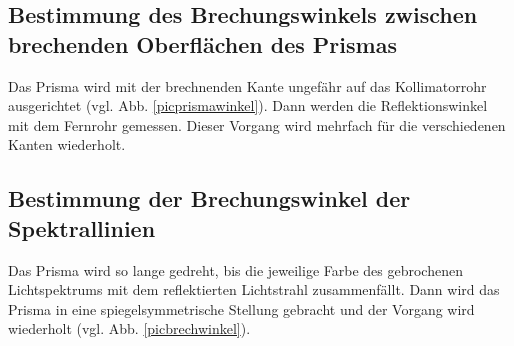 %
%
\subsection{Bestimmung des Brechungswinkels zwischen brechenden Oberflächen des Prismas}
Das Prisma wird mit der brechnenden Kante ungefähr auf das Kollimatorrohr ausgerichtet (vgl. Abb. \ref{picprismawinkel}).
Dann werden die Reflektionswinkel mit dem Fernrohr gemessen. Dieser Vorgang wird mehrfach für die verschiedenen Kanten wiederholt.
\subsection{Bestimmung der Brechungswinkel der Spektrallinien}
Das Prisma wird so lange gedreht, bis die jeweilige Farbe des gebrochenen Lichtspektrums mit dem reflektierten Lichtstrahl
zusammenfällt. Dann wird das Prisma in eine spiegelsymmetrische Stellung gebracht und der Vorgang wird wiederholt (vgl. Abb. \ref{picbrechwinkel}).